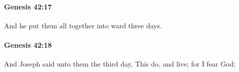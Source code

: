 		\paragraph{Genesis 42:17} %
			\label{GENESIS-42-17}

			And he put them all together into ward three days.


		\paragraph{Genesis 42:18} %
			\label{GENESIS-42-18}

			And Joseph said unto them the third day, This do, and live; for I fear God:


